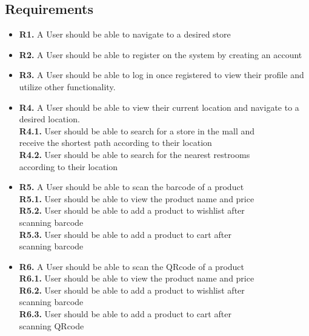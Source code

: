 \documentclass{article}
\begin{document}
\subsection{Requirements}
\begin{itemize}
    \item[] \textbf{R1.} A User should be able to navigate to a desired store
     
    \item[] \textbf{R2.} A User should be able to register on the system by creating an account
    
    \item[] \textbf{R3.} A User should be able to log in once registered to view their profile and utilize other functionality.
    
    \item[] \textbf{R4.} A User should be able to view their current location and navigate to a desired location.\\
    \setlength{\parindent}{24pt}
    \indent \textbf{R4.1.} User should be able to search for a store in the mall and\\
    \indent receive the shortest path according to their location\\
    \indent \textbf{R4.2.} User should be able to search for the nearest restrooms\\
    \indent according to their location
    
    \item[] \textbf{R5.} A User should be able to scan the barcode of a product\\ 
    \setlength{\parindent}{24pt}
    \indent \textbf{R5.1.} User should be able to view the product name and price\\
    \indent \textbf{R5.2.} User should be able to add a product to wishlist after\\ \indent scanning barcode\\
    \indent \textbf{R5.3.} User should be able to add a product to cart after\\ \indent scanning barcode
    
    \item[] \textbf{R6.} A User should be able to scan the QRcode of a product\\ 
    \setlength{\parindent}{24pt}
    \indent \textbf{R6.1.} User should be able to view the product name and price\\
    \indent \textbf{R6.2.} User should be able to add a product to wishlist after\\ \indent scanning barcode\\
    \indent \textbf{R6.3.} User should be able to add a product to cart after\\ \indent scanning QRcode
    

\end{itemize}
\end{document}
